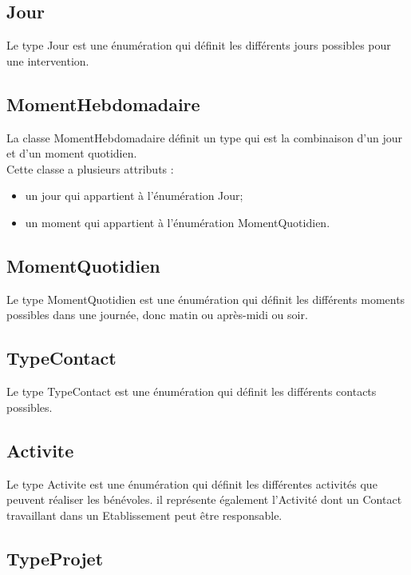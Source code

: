 \documentclass[asi, sansVersion]{picInsa}
\begin{document}
\subsection*{Jour}

Le type Jour est une énumération qui définit les différents jours possibles pour une intervention.

\subsection*{MomentHebdomadaire}

La classe MomentHebdomadaire définit un type qui est la combinaison d'un jour et d'un moment quotidien.\\
Cette classe a plusieurs attributs :
\begin{itemize}
\item un jour qui appartient à l'énumération Jour;
\item un moment qui appartient à l'énumération MomentQuotidien.
\end{itemize}

\subsection*{MomentQuotidien}

Le type MomentQuotidien est une énumération qui définit les différents moments possibles dans une journée, donc matin ou après-midi ou soir.

\subsection*{TypeContact}

Le type TypeContact est une énumération qui définit les différents contacts possibles.

\subsection*{Activite}

Le type Activite est une énumération qui définit les différentes activités que peuvent réaliser les bénévoles. il représente également l'Activité dont un Contact travaillant dans un Etablissement peut être responsable.

\subsection*{TypeProjet}
\end{document}
